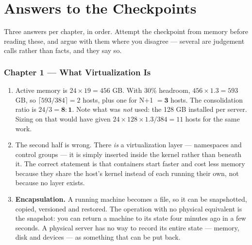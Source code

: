 \chapter{Answers to the Checkpoints}\label{app:answers}
\normalfigures

Three answers per chapter, in order. Attempt the checkpoint from memory before
reading these, and argue with them where you disagree --- several are judgement
calls rather than facts, and they say so.

\newcommand{\ansch}[1]{\subsection*{\color{primary}Chapter #1}}
\newenvironment{ans}
  {\begin{enumerate}[leftmargin=*, itemsep=4pt, topsep=3pt,
                     label=\textbf{\arabic*.}]}
  {\end{enumerate}}

\ansch{1 --- What Virtualization Is}
\begin{ans}
  \item Active memory is $24 \times 19 = 456$ GB. With 30\% headroom,
        $456 \times 1.3 = 593$ GB, so $\lceil 593/384 \rceil = 2$ hosts, plus
        one for N+1 $= \mathbf{3}$ hosts. The consolidation ratio is
        $24/3 = \mathbf{8:1}$. Note what was \emph{not} used: the 128 GB
        installed per server. Sizing on that would have given
        $24 \times 128 \times 1.3 / 384 = 11$ hosts for the same work.
  \item The second half is wrong. There \emph{is} a virtualization layer ---
        namespaces and control groups --- it is simply inserted inside the
        kernel rather than beneath it. The correct statement is that containers
        start faster and cost less memory because they share the host's kernel
        instead of each running their own, not because no layer exists.
  \item \textbf{Encapsulation.} A running machine becomes a file, so it can be
        snapshotted, copied, versioned and restored. The operation with no
        physical equivalent is the snapshot: you can return a machine to its
        state four minutes ago in a few seconds. A physical server has no way to
        record its entire state --- memory, disk and devices --- as something
        that can be put back.
\end{ans}

